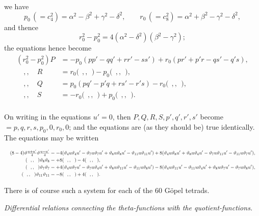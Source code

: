 \documentclass[11pt]{article}
\begin{document}
we have
\[
p_0\,(= c_4^2) = \alpha^2 - \beta^2 + \gamma^2 - \delta^2,\qquad r_0\,(= c_8^2) = \alpha^2 + \beta^2 - \gamma^2 - \delta^2,
\]
and thence
\[
r_0^2 - p_0^2 = 4(\alpha^2 - \delta^2)(\beta^2 - \gamma^2);
\]
the equations hence become
\[
\begin{aligned}
(r_0^2 - p_0^2)P &= -p_0(pp' - qq' + rr' - ss') + r_0(pr' + p'r - qs' - q's),\\
\quad,,\quad R &= r_0\bigl(\ \ ,, \ \ \bigr) - p_0\bigl(\ \ ,, \ \ \bigr),\\
\quad,,\quad Q &= p_0(pq' - p'q + rs' - r's) - r_0\bigl(\ \ ,, \ \ \bigr),\\
\quad,,\quad S &= -r_0\bigl(\ \ ,, \ \ \bigr) + p_0\bigl(\ \ ,, \ \ \bigr).\\
\end{aligned}
\]

On writing in the equations $u' = 0$, then $P, Q, R, S, p', q', r', s'$ become $=p, q, r, s, p_0, 0, r_0, 0$; and the equations are (as they should be) true identically. The equations may be written

{\footnotesize
\[
\resizebox{\textwidth}{!}{$\displaystyle
\begin{aligned}
(8 - 4)\vartheta\tfrac{u+u'}{4}\vartheta\tfrac{u-u'}{4} &= -4(\vartheta_4 u\vartheta_4 u' - \vartheta_7 u\vartheta_7 u' + \vartheta_8 u\vartheta_8 u' - \vartheta_{11}u\vartheta_{11}u') + 8(\vartheta_4 u\vartheta_8 u' + \vartheta_8 u\vartheta_4 u' - \vartheta_7 u\vartheta_{11}u' - \vartheta_{11}u\vartheta_7 u'),\\
(\ \ ,, \ \ )\vartheta_8\vartheta_8 &= +8(\ \ ,, \ \ ) - 4(\ \ ,, \ \ ),\\
(\ \ ,, \ \ )\vartheta_7\vartheta_7 &= +4(\vartheta_4 u\vartheta_7 u' - \vartheta_7 u\vartheta_4 u' + \vartheta_8 u\vartheta_{11}u' - \vartheta_{11}u\vartheta_8 u') - 8(\vartheta_4 u\vartheta_{11}u' - \vartheta_{11}u\vartheta_4 u' + \vartheta_8 u\vartheta_7 u' - \vartheta_7 u\vartheta_8 u'),\\
(\ \ ,, \ \ )\vartheta_{11}\vartheta_{11} &= -8(\ \ ,, \ \ ) + 4(\ \ ,, \ \ ).\\
\end{aligned}
$}
\]
}

There is of course such a system for each of the 60 G\"opel tetrads.

\medskip
\begin{center}\textit{Differential relations connecting the theta-functions with the quotient-functions.}\end{center}
\end{document}
